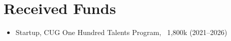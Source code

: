 \section{Received Funds}

\begin{itemize}
\item Startup, CUG One Hundred Talents Program, \textyen\ 1,800k (2021--2026)
\end{itemize}
